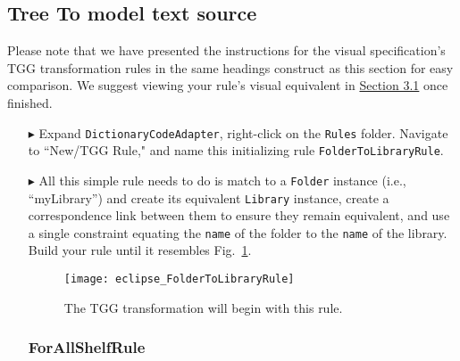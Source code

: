 \newpage
\hypertarget{treeToModel tex}{}
\subsection{Tree To model text source}
\texHeader

Please note that we have presented the instructions for the visual specification's TGG transformation rules in the same headings construct as this section for
easy comparison. We suggest viewing your rule's visual equivalent in \hyperlink{treeToModel tex}{Section 3.1} once finished.

\begin{itemize}

\subsubsection{FolderToLibraryRule} %

\item[$\blacktriangleright$] Expand \texttt{DictionaryCodeAdapter}, right-click on the \texttt{Rules} folder. Navigate to ``New/TGG Rule," and name this
initializing rule \texttt{Folder\-To\-Lib\-rary\-Rule}.

\item[$\blacktriangleright$] All this simple rule needs to do is match to a \texttt{Folder} instance (i.e., ``myLibrary'') and create its equivalent
\texttt{Library} instance, create a correspondence link between them to ensure they remain equivalent, and use a single constraint equating the \texttt{name} of
the folder to the \texttt{name} of the library. Build your rule until it resembles Fig.~\ref{eclipse:FolderToLibraryRule}.

\vspace{0.5cm}

\begin{figure}[htbp]
\begin{center}
  \texttt{[image: eclipse\_FolderToLibraryRule]}
  \caption{The TGG transformation will begin with this rule.}
  \label{eclipse:FolderToLibraryRule}
\end{center}
\end{figure}

\vspace{-0.5cm}

\subsubsection{ForAllShelfRule} %


\end{itemize}
